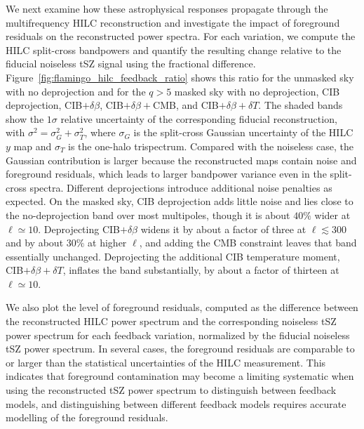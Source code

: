 \documentclass[aps,prd,twocolumn,superscriptaddress,nofootinbib,floatfix]{revtex4-2}
\begin{document}
We next examine how these astrophysical responses propagate through the multifrequency HILC reconstruction and investigate the impact of foreground residuals on the reconstructed power spectra. For each variation, we compute the HILC split-cross bandpowers and quantify the resulting change relative to the fiducial noiseless tSZ signal using the fractional difference. Figure~\ref{fig:flamingo_hilc_feedback_ratio} shows this ratio for the unmasked sky with no deprojection and for the $q>5$ masked sky with no deprojection, CIB deprojection, CIB$+\delta\beta$, CIB$+\delta\beta+$CMB, and CIB$+\delta\beta+\delta T$. The shaded bands show the $1\sigma$ relative uncertainty of the corresponding fiducial reconstruction, with $\sigma^2=\sigma_G^2+\sigma_T^2$, where $\sigma_G$ is the split-cross Gaussian uncertainty of the HILC $y$ map and $\sigma_T$ is the one-halo trispectrum. Compared with the noiseless case, the Gaussian contribution is larger because the reconstructed maps contain noise and foreground residuals, which leads to larger bandpower variance even in the split-cross spectra. Different deprojections introduce additional noise penalties as expected. On the masked sky, CIB deprojection adds little noise and lies close to the no-deprojection band over most multipoles, though it is about $40\%$ wider at $\ell\simeq10$. Deprojecting CIB$+\delta\beta$ widens it by about a factor of three at $\ell\lesssim300$ and by about $30\%$ at higher $\ell$, and adding the CMB constraint leaves that band essentially unchanged. Deprojecting the additional CIB temperature moment, CIB$+\delta\beta+\delta T$, inflates the band substantially, by about a factor of thirteen at $\ell\simeq10$.

We also plot the level of foreground residuals, computed as the difference between the reconstructed HILC power spectrum and the corresponding noiseless tSZ power spectrum for each feedback variation, normalized by the fiducial noiseless tSZ power spectrum. In several cases, the foreground residuals are comparable to or larger than the statistical uncertainties of the HILC measurement. This indicates that foreground contamination may become a limiting systematic when using the reconstructed tSZ power spectrum to distinguish between feedback models, and distinguishing between different feedback models requires accurate modelling of the foreground residuals.
\end{document}
